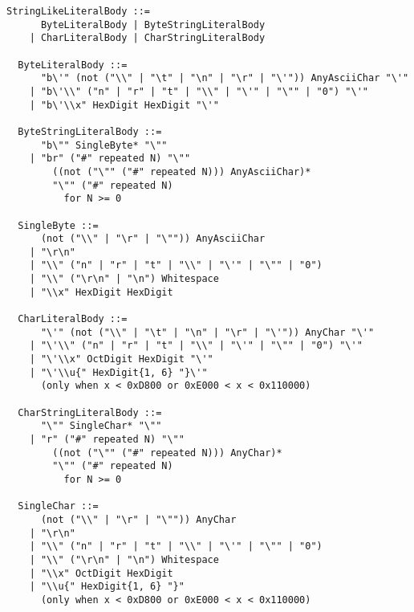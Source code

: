 \documentclass[dvipdfmx,uplatex,papersize,a4paper,10pt]{jsbook}
\theoremstyle{definition}
\begin{document}
\begin{lstlisting}[gobble=2]
  StringLikeLiteralBody ::=
      ByteLiteralBody | ByteStringLiteralBody
    | CharLiteralBody | CharStringLiteralBody

  ByteLiteralBody ::=
      "b\'" (not ("\\" | "\t" | "\n" | "\r" | "\'")) AnyAsciiChar "\'"
    | "b\'\\" ("n" | "r" | "t" | "\\" | "\'" | "\"" | "0") "\'"
    | "b\'\\x" HexDigit HexDigit "\'"

  ByteStringLiteralBody ::=
      "b\"" SingleByte* "\""
    | "br" ("#" repeated N) "\""
        ((not ("\"" ("#" repeated N))) AnyAsciiChar)*
        "\"" ("#" repeated N)
          for N >= 0

  SingleByte ::=
      (not ("\\" | "\r" | "\"")) AnyAsciiChar
    | "\r\n"
    | "\\" ("n" | "r" | "t" | "\\" | "\'" | "\"" | "0")
    | "\\" ("\r\n" | "\n") Whitespace
    | "\\x" HexDigit HexDigit

  CharLiteralBody ::=
      "\'" (not ("\\" | "\t" | "\n" | "\r" | "\'")) AnyChar "\'"
    | "\'\\" ("n" | "r" | "t" | "\\" | "\'" | "\"" | "0") "\'"
    | "\'\\x" OctDigit HexDigit "\'"
    | "\'\\u{" HexDigit{1, 6} "}\'"
      (only when x < 0xD800 or 0xE000 < x < 0x110000)

  CharStringLiteralBody ::=
      "\"" SingleChar* "\""
    | "r" ("#" repeated N) "\""
        ((not ("\"" ("#" repeated N))) AnyChar)*
        "\"" ("#" repeated N)
          for N >= 0

  SingleChar ::=
      (not ("\\" | "\r" | "\"")) AnyChar
    | "\r\n"
    | "\\" ("n" | "r" | "t" | "\\" | "\'" | "\"" | "0")
    | "\\" ("\r\n" | "\n") Whitespace
    | "\\x" OctDigit HexDigit
    | "\\u{" HexDigit{1, 6} "}"
      (only when x < 0xD800 or 0xE000 < x < 0x110000)
\end{lstlisting}
\end{document}
